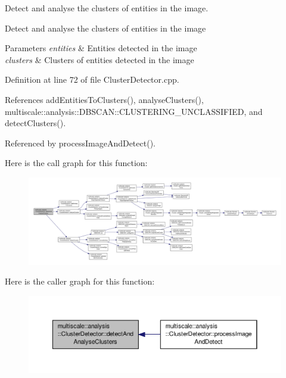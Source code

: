 Detect and analyse the clusters of entities in the image. 

Detect and analyse the clusters of entities in the image


\begin{DoxyParams}{Parameters}
{\em entities} & Entities detected in the image \\
\hline
{\em clusters} & Clusters of entities detected in the image \\
\hline
\end{DoxyParams}


Definition at line 72 of file Cluster\-Detector.\-cpp.



References add\-Entities\-To\-Clusters(), analyse\-Clusters(), multiscale\-::analysis\-::\-D\-B\-S\-C\-A\-N\-::\-C\-L\-U\-S\-T\-E\-R\-I\-N\-G\-\_\-\-U\-N\-C\-L\-A\-S\-S\-I\-F\-I\-E\-D, and detect\-Clusters().



Referenced by process\-Image\-And\-Detect().



Here is the call graph for this function\-:
\nopagebreak
\begin{figure}[H]
\begin{center}
\leavevmode
\includegraphics[width=350pt]{classmultiscale_1_1analysis_1_1ClusterDetector_a46f98e066e74171774f0b6728118bc7b_cgraph}
\end{center}
\end{figure}




Here is the caller graph for this function\-:\nopagebreak
\begin{figure}[H]
\begin{center}
\leavevmode
\includegraphics[width=350pt]{classmultiscale_1_1analysis_1_1ClusterDetector_a46f98e066e74171774f0b6728118bc7b_icgraph}
\end{center}
\end{figure}


